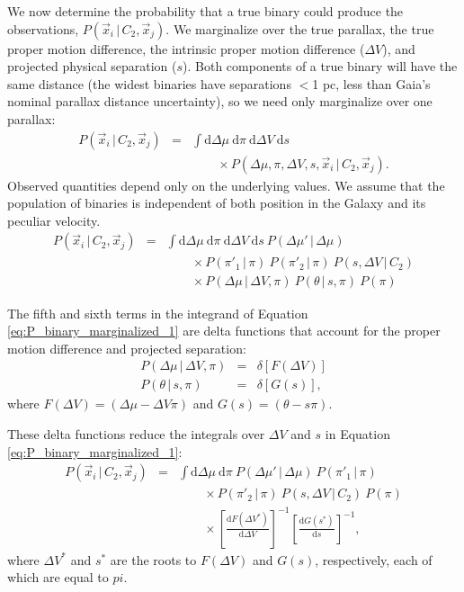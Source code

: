 \documentclass[usenatbib]{mnras}
\newcommand{\given}{\,|\,}
\newcommand{\dd}{\mathrm{d}}
\begin{document}
We now determine the probability that a true binary could produce the observations, $P(\vec{x}_i \given C_2, \vec{x}_j)$. We marginalize over the true parallax, the true proper motion difference, the intrinsic proper motion difference ($\Delta V$), and projected physical separation ($s$). Both components of a true binary will have the same distance (the widest binaries have separations $<$1 pc, less than Gaia's nominal parallax distance uncertainty), so we need only marginalize over one parallax:
\begin{eqnarray}
P(\vec{x}_i \given C_2, \vec{x}_j) &=& \int \dd \Delta \mu\ \dd \pi\ \dd \Delta V\ \dd s\ \nonumber \\
& & \qquad \times P( \Delta \mu, \pi, \Delta V, s,\vec{x}_i \given C_2, \vec{x}_j ).
\end{eqnarray}
Observed quantities depend only on the underlying values. We assume that the population of binaries is independent of both position in the Galaxy and its peculiar velocity. 
\begin{eqnarray}
P(\vec{x}_i \given C_2, \vec{x}_j) &=& \int \dd \Delta \mu\ \dd \pi\ \dd \Delta V\ \dd s\ P(\Delta \mu' \given \Delta \mu) \nonumber \\
& & \qquad \times P(\pi'_1 \given \pi)\ P(\pi'_2 \given \pi)\ P(s, \Delta V \given C_2) \nonumber \\
& & \qquad \times P(\Delta \mu \given \Delta V, \pi)\ P(\theta \given s, \pi)\ P(\pi) \label{eq:P_binary_marginalized_1}
\end{eqnarray}

The fifth and sixth terms in the integrand of Equation \ref{eq:P_binary_marginalized_1} are delta functions that account for the proper motion difference and projected separation:
\begin{eqnarray}
P(\Delta \mu \given \Delta V, \pi) &=& \delta \left[ F(\Delta V) \right] \\ 
P(\theta \given s, \pi) &=& \delta \left[ G(s) \right], 
\end{eqnarray}
where $F(\Delta V) = (\Delta \mu - \Delta V \pi)$ and $G(s) = (\theta - s \pi)$. 

These delta functions reduce the integrals over $\Delta V$ and $s$ in Equation \ref{eq:P_binary_marginalized_1}:
\begin{eqnarray}
P(\vec{x}_i \given C_2, \vec{x}_j) &=& \int \dd \Delta \mu\ \dd \pi\ P(\Delta \mu' \given \Delta \mu)\ P(\pi'_1 \given \pi) \nonumber \\
& & \qquad \times P(\pi'_2 \given \pi)\ P(s, \Delta V \given C_2)\ P(\pi) \nonumber \\
& & \qquad \times  \left[ \frac{\dd F(\Delta V^*)}{\dd \Delta V} \right]^{-1} \left[ \frac{\dd G(s^*)}{\dd s} \right]^{-1}, \label{eq:P_binary_marginalized}
\end{eqnarray}
where $\Delta V^*$ and $s^*$ are the roots to $F(\Delta V)$ and $G(s)$, respectively, each of which are equal to $pi$.
\end{document}
